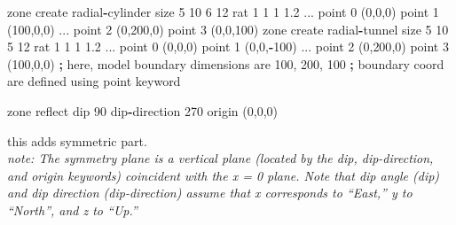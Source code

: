 \documentclass[a4paper, nobind]{templates/ociamthesis}
\newenvironment{Shaded}{\begin{snugshade}}{\end{snugshade}}
\newcommand{\DecValTok}[1]{\textcolor[rgb]{0.00,0.00,0.81}{#1}}
\newcommand{\FloatTok}[1]{\textcolor[rgb]{0.00,0.00,0.81}{#1}}
\newcommand{\NormalTok}[1]{#1}
\newcommand{\OperatorTok}[1]{\textcolor[rgb]{0.81,0.36,0.00}{\textbf{#1}}}
\renewenvironment{Shaded}
{
  \vspace{10pt}%
  \begin{snugshade}%
}{%
  \end{snugshade}%
  \vspace{8pt}%
}
\begin{document}
\begin{Shaded}
\begin{Highlighting}[]
\NormalTok{zone create radial}\OperatorTok{{-}}\NormalTok{cylinder size }\DecValTok{5} \DecValTok{10} \DecValTok{6} \DecValTok{12}\NormalTok{ rat }\DecValTok{1} \DecValTok{1} \DecValTok{1} \FloatTok{1.2}\NormalTok{ ...}
\NormalTok{                           point }\DecValTok{0}\NormalTok{ (}\DecValTok{0}\NormalTok{,}\DecValTok{0}\NormalTok{,}\DecValTok{0}\NormalTok{) point }\DecValTok{1}\NormalTok{ (}\DecValTok{100}\NormalTok{,}\DecValTok{0}\NormalTok{,}\DecValTok{0}\NormalTok{) ...}
\NormalTok{                           point }\DecValTok{2}\NormalTok{ (}\DecValTok{0}\NormalTok{,}\DecValTok{200}\NormalTok{,}\DecValTok{0}\NormalTok{) point }\DecValTok{3}\NormalTok{ (}\DecValTok{0}\NormalTok{,}\DecValTok{0}\NormalTok{,}\DecValTok{100}\NormalTok{)}
\NormalTok{zone create radial}\OperatorTok{{-}}\NormalTok{tunnel size }\DecValTok{5} \DecValTok{10} \DecValTok{5} \DecValTok{12}\NormalTok{ rat }\DecValTok{1} \DecValTok{1} \DecValTok{1} \FloatTok{1.2}\NormalTok{ ...}
\NormalTok{                          point }\DecValTok{0}\NormalTok{ (}\DecValTok{0}\NormalTok{,}\DecValTok{0}\NormalTok{,}\DecValTok{0}\NormalTok{) point }\DecValTok{1}\NormalTok{ (}\DecValTok{0}\NormalTok{,}\DecValTok{0}\NormalTok{,}\OperatorTok{{-}}\DecValTok{100}\NormalTok{) ...}
\NormalTok{                          point }\DecValTok{2}\NormalTok{ (}\DecValTok{0}\NormalTok{,}\DecValTok{200}\NormalTok{,}\DecValTok{0}\NormalTok{) point }\DecValTok{3}\NormalTok{ (}\DecValTok{100}\NormalTok{,}\DecValTok{0}\NormalTok{,}\DecValTok{0}\NormalTok{)}
\OperatorTok{;}\NormalTok{ here, model boundary dimensions are }\DecValTok{100}\NormalTok{, }\DecValTok{200}\NormalTok{, }\DecValTok{100}
\OperatorTok{;}\NormalTok{ boundary coord are defined using point keyword}

\NormalTok{zone reflect dip }\DecValTok{90}\NormalTok{ dip}\OperatorTok{{-}}\NormalTok{direction }\DecValTok{270}\NormalTok{ origin (}\DecValTok{0}\NormalTok{,}\DecValTok{0}\NormalTok{,}\DecValTok{0}\NormalTok{) }
\end{Highlighting}
\end{Shaded}

this adds symmetric part.\\
\emph{note: The symmetry plane is a vertical plane (located by the dip, dip-direction, and origin keywords) coincident with the x = 0 plane. Note that dip angle (dip) and dip direction (dip-direction) assume that x corresponds to ``East,'' y to ``North'', and z to ``Up.''}\\
\end{document}
